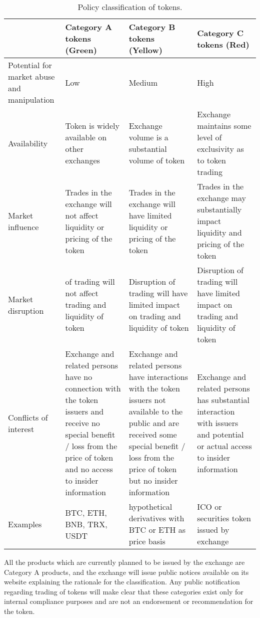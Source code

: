 \begin{table}[htbp]
\centering
\begin{tabularx}{\textwidth}{|X|X|X|X|}
\hline
& \textbf{Category A tokens (Green)} & \textbf{Category B tokens (Yellow)} &
\textbf{Category C tokens (Red)} \\
\hline
Potential for market abuse and manipulation & Low & Medium & High \\
Availability & Token is widely available on other exchanges & Exchange
volume is a substantial volume of token & Exchange maintains some
level of exclusivity as to token trading \\
\hline
Market influence & Trades in the exchange will not affect
liquidity or pricing of the token & Trades in the exchange will
have limited liquidity or pricing of the token & Trades in the
exchange may substantially impact liquidity and pricing of the token \\
\hline
Market disruption & of trading will not affect trading and
liquidity of token & Disruption of trading will have limited impact on
trading and liquidity of token & Disruption of trading will have
limited impact on trading and liquidity of token  \\
\hline
Conflicts of interest & Exchange and related persons have no connection
with the token issuers and receive no special benefit / loss from the price of
token and no access to insider information & Exchange and related persons have interactions with the token
issuers not available to the public and are received some special
benefit / loss from the price of token but no insider information & Exchange and related persons has
substantial interaction with issuers and potential or actual access to
insider information\\
\hline
Examples & BTC, ETH, BNB, TRX, USDT & hypothetical derivatives with BTC
or ETH as price basis & ICO or securities token issued by exchange \\
\hline
\end{tabularx}
\caption{Policy classification of tokens.}
\end{table}

All the products which are currently planned to be issued by
the exchange are Category A products, and the exchange will issue
public notices available on its website explaining the rationale for
the classification.  Any public notification regarding trading of
tokens will make clear that these categories exist only for internal
compliance purposes and are not an endorsement or recommendation for
the token.

